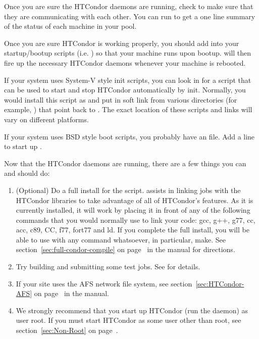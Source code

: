 Once you are sure the HTCondor daemons are running, check to make sure
that they are communicating with each other.  You can run
 to get a one line summary of the status of each
machine in your pool.

Once you are sure HTCondor is working properly, you should add
 into your startup/bootup scripts (i.e.  ) so
that your machine runs  upon bootup.  
will then fire up the necessary HTCondor daemons whenever your machine
is rebooted.  

If your system uses System-V style init scripts, you can look in
 for a script that can be used
to start and stop HTCondor automatically by init.  Normally, you would
install this script as  and put in soft link from
various directories (for example, ) that point back to
.  The exact location of these scripts and links
will vary on different platforms.

If your system uses BSD style boot scripts, you probably have an
 file.  Add a line to start up
.


Now that the HTCondor daemons are running, there are a few things you
can and should do:

\begin{enumerate}
\item (Optional) Do a full install for the  script.
     assists in linking jobs with the HTCondor libraries
    to take advantage of all of HTCondor's features.  As it is currently
    installed, it will work by placing it in front of any of the
    following commands that you would normally use to link your code:
    gcc, g++, g77, cc, acc, c89, CC, f77, fort77 and ld.  If you
    complete the full install, you will be able to use
     with any command whatsoever, in particular, make.
    See section~\ref{sec:full-condor-compile} on
    page~\pageref{sec:full-condor-compile} in the manual for
    directions.

\item Try building and submitting some test jobs.  See
     for details.

\item If your site uses the AFS network file system, see
section~\ref{sec:HTCondor-AFS} on page~\pageref{sec:HTCondor-AFS} in the
manual.

\item We strongly recommend that you start up HTCondor (run the
 daemon) as user root.  If you must start HTCondor as
some user other than root, see section~\ref{sec:Non-Root} on
page~\pageref{sec:Non-Root}.

\end{enumerate}

